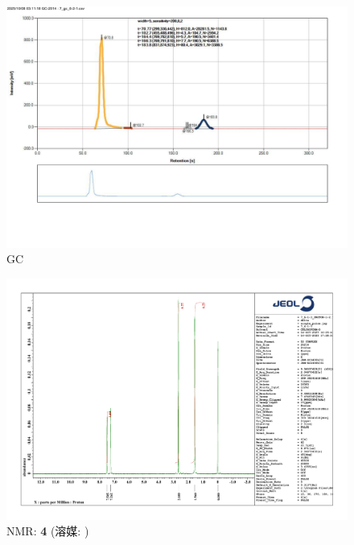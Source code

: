 \documentclass{ltjsarticle}
\theoremstyle{definition}
\numberwithin{equation}{section}
\begin{document}
\begin{figure}[htbp]
\begin{center}
\includegraphics[width = 15 cm]{GC_6-2-1.pdf}
\caption{GC}
\label{GC_6-2}
\end{center}
\end{figure}


\begin{figure}[htbp]
\begin{center}
\includegraphics[width = 15 cm]{NMR_6-1-3.pdf}
\caption{NMR: \textbf{4} (溶媒: )}
\label{NMR_6-1-3}
\end{center}
\end{figure}
\end{document}
